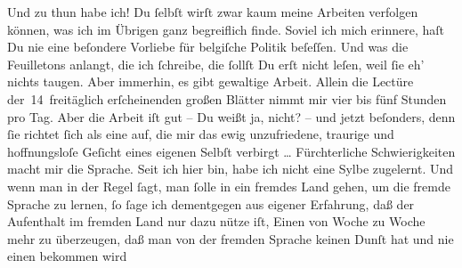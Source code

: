 \pstart
           Und zu thun habe ich! Du{ }ſelbſt wirſt zwar kaum meine Arbeiten verfolgen können, was
               ich im Übrigen ganz begreiflich finde. Soviel ich mich erinnere, haſt Du nie eine
               beſondere Vorliebe für belgiſche Politik
               beſeſſen. Und was die Feuilletons anlangt, die ich{ }ſchreibe, die{ }ſollſt Du erſt nicht
               leſen, weil{ }ſie eh’ nichts taugen. Aber immerhin, es gibt gewaltige Arbeit. Allein
               die Lectüre der 14 freitäglich erſcheinenden großen Blätter nimmt mir vier bis fünf
               Stunden pro Tag. Aber die Arbeit iſt gut – Du weißt ja, nicht? – und jetzt beſonders,
               denn{ }ſie richtet{ }ſich als eine \label{K_L02664-9v}\label{K_L02664-9} auf, die mir das {\pb}ewig unzufriedene, traurige und hoffnungsloſe
               Geſicht eines eigenen Selbſt verbirgt {\dots} Fürchterliche
               Schwierigkeiten macht mir die Sprache. Seit ich hier bin, habe ich nicht eine Sylbe
               zugelernt. Und wenn man in der Regel{ }ſagt, man{ }ſolle in ein fremdes Land gehen, um
               die fremde Sprache zu lernen,{ }ſo{ }ſage ich dementgegen aus eigener Erfahrung, daß der
               Aufenthalt im fremden Land nur dazu nütze iſt, Einen von Woche zu Woche mehr zu
               überzeugen, daß man von der fremden Sprache keinen Dunſt hat und nie einen bekommen
                  wird{\dotsfour}\pend
           
